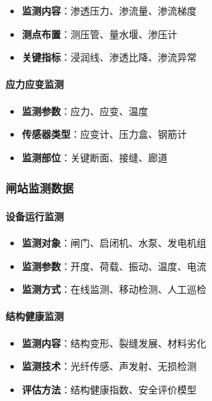 \begin{itemize}
\tightlist
\item
  \textbf{监测内容}：渗透压力、渗流量、渗流梯度
\item
  \textbf{测点布置}：测压管、量水堰、渗压计
\item
  \textbf{关键指标}：浸润线、渗透比降、渗流异常
\end{itemize}

\paragraph{应力应变监测}\label{ux5e94ux529bux5e94ux53d8ux76d1ux6d4b}

\begin{itemize}
\tightlist
\item
  \textbf{监测参数}：应力、应变、温度
\item
  \textbf{传感器类型}：应变计、压力盒、钢筋计
\item
  \textbf{监测部位}：关键断面、接缝、廊道
\end{itemize}

\subsubsection{闸站监测数据}\label{ux95f8ux7ad9ux76d1ux6d4bux6570ux636e}

\paragraph{设备运行监测}\label{ux8bbeux5907ux8fd0ux884cux76d1ux6d4b}

\begin{itemize}
\tightlist
\item
  \textbf{监测对象}：闸门、启闭机、水泵、发电机组
\item
  \textbf{监测参数}：开度、荷载、振动、温度、电流
\item
  \textbf{监测方式}：在线监测、移动检测、人工巡检
\end{itemize}

\paragraph{结构健康监测}\label{ux7ed3ux6784ux5065ux5eb7ux76d1ux6d4b}

\begin{itemize}
\tightlist
\item
  \textbf{监测内容}：结构变形、裂缝发展、材料劣化
\item
  \textbf{监测技术}：光纤传感、声发射、无损检测
\item
  \textbf{评估方法}：结构健康指数、安全评价模型
\end{itemize}

